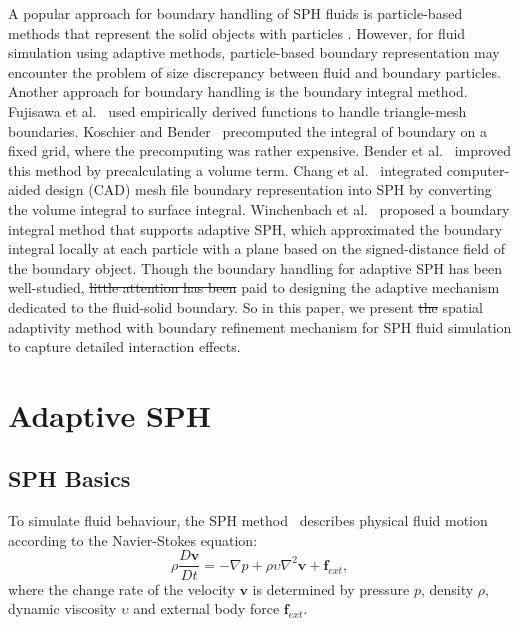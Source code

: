 \documentclass[VANCOUVER,STIX1COL]{WileyNJD-v2}
\providecommand{\DIFadd}[1]{{\protect\color{blue}\uwave{#1}}} %
\providecommand{\DIFdel}[1]{{\protect\color{red}\sout{#1}}}                      %
\providecommand{\DIFaddbegin}{} %
\providecommand{\DIFaddend}{} %
\providecommand{\DIFdelbegin}{} %
\providecommand{\DIFdelend}{} %
\begin{document}
A popular approach for boundary handling of SPH fluids is particle-based methods that represent the solid objects with particles \cite{Akinci12, Band18b}. However, for fluid simulation using adaptive methods, particle-based boundary representation may encounter the problem of size discrepancy between fluid and boundary particles. Another approach for boundary handling is the boundary integral method. Fujisawa et al.~\cite{Fujisawa15} used empirically derived functions to handle triangle-mesh boundaries. Koschier and Bender~\cite{Koschier17} precomputed the integral of boundary on a fixed grid, where the precomputing was rather expensive. Bender et al.~\cite{Bender19} improved this method by precalculating a volume term. Chang et al.~\cite{Chang20} integrated computer-aided design (CAD) mesh file boundary representation into SPH by converting the volume integral to surface integral. Winchenbach et al.~\cite{Winchenbach20} proposed a boundary integral method that supports adaptive SPH, which approximated the boundary integral locally at each particle with a plane based on the signed-distance field of the boundary object. Though the boundary handling for adaptive SPH has been well-studied, \DIFdelbegin \DIFdel{little attention has been }\DIFdelend \DIFaddbegin \DIFadd{more attention needs to be }\DIFaddend paid to designing the adaptive mechanism dedicated to the fluid-solid boundary. So in this paper, we present \DIFdelbegin \DIFdel{the }\DIFdelend \DIFaddbegin \DIFadd{a }\DIFaddend spatial adaptivity method with \DIFaddbegin \DIFadd{the }\DIFaddend boundary refinement mechanism for SPH fluid simulation to capture detailed interaction effects.

\section{Adaptive SPH}

\subsection{SPH Basics}

To simulate fluid behaviour, the SPH method~\cite{Koschier19} describes physical fluid motion according to the Navier-Stokes equation:
\begin{equation}
    \rho \frac{D\mathbf{v}}{Dt}=-\nabla p + \rho \upsilon \nabla^2 \mathbf{v} + \mathbf{f}_{ext},
\label{equ-2}
\end{equation}
where the change rate of the velocity $\mathbf{v}$ is determined by pressure $p$, density $\rho$, dynamic viscosity $\upsilon$ and external body force $\mathbf{f}_{ext}$.
\end{document}
